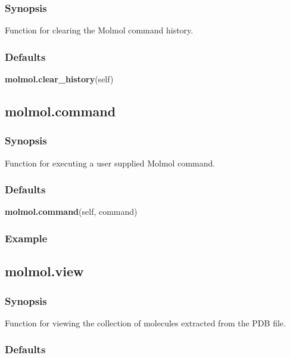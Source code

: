 \subsubsection{Synopsis}

Function for clearing the Molmol command history.

\subsubsection{Defaults}

\textsf{\textbf{molmol.clear\_history}(self)}



\newpage

\subsection{molmol.command}


\subsubsection{Synopsis}

Function for executing a user supplied Molmol command.

\subsubsection{Defaults}

\textsf{\textbf{molmol.command}(self, command)}


\subsubsection{Example}




\newpage

\subsection{molmol.view}


\subsubsection{Synopsis}

Function for viewing the collection of molecules extracted from the PDB file.

\subsubsection{Defaults}

